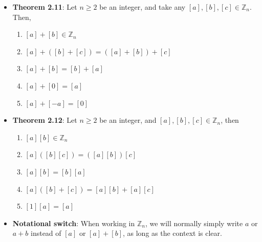\documentclass{report}
\begin{document}
\begin{itemize}
\begin{align*}
            .\end{align*}
            Thus, 
            \begin{align*}
                a_{1} + b_{1} \equiv a_{2} + b_{2} \pmod{n}
            .\end{align*}
            Hence, $[a_{1} + b_{1}] = [a_{2} + b_{2}] $, and we can say that addition is well-defined.
            \bigbreak \noindent 
            Now, 
            \begin{align*}
                a_{1} &= nc + a_{2}, \\
                b_{1} &= nk + b_{2}
            .\end{align*}
            So,
            \begin{align*}
                a_{1}b_{1} &= (nc + a_{2})(nk+b_{2}) = n^{2}ck + ncb_{2} + nka_{2} + a_{2}b_{2}
            .\end{align*}
            Hence,
            \begin{align*}
                a_{1} b_{1} - a_{2} b_{2} &= n(nck + cb_{2} + ka_{2})
            ,\end{align*}
            and we can say that $a_{1}b_{1} \equiv a_{2}b_{2}$, so
            \begin{align*}
                [a_{1}b_{1}] = [a_{2}b_{2}]
            .\end{align*}
            Therefore, multiplication on residue classes is also well-defined.
        \item \textbf{Theorem 2.11}: Let $n \geq 2$ be an integer, and take any $[a], [b], [c] \in \mathbb{Z}_{n}$. Then,
            \begin{enumerate}
                \item $[a] + [b] \in \mathbb{Z}_{n}$
                \item $[a] + ([b] + [c]) = ([a] + [b]) + [c] $
                \item $[a] + [b] = [b] + [a] $
                \item $[a] + [0]  = [a]$
                \item $[a] + [-a] = [0] $
            \end{enumerate}
        \item \textbf{Theorem 2.12}: Let $n \geq 2$ be an integer, and $[a], [b], [c] \in \mathbb{Z}_{n}$, then
            \begin{enumerate}
                \item $[a][b] \in \mathbb{Z}_{n}$
                \item $[a]([b][c]) = ([a][b])[c] $
                \item $[a][b] = [b][a] $
                \item $[a]([b] + [c]) = [a][b] + [a][c]$
                \item $[1][a]  = [a]$
            \end{enumerate}
        \item \textbf{Notational switch}: When working in $ \mathbb{Z}_{n}$, we will normally simply write $a$ or $a+b$ instead of $[a]$ or $[a] + [b]$, as long as the context is clear.

    \end{itemize}
\end{document}
